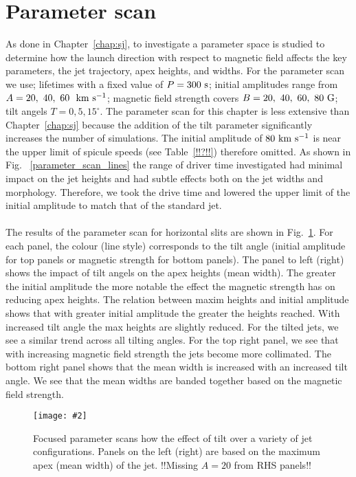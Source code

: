 \documentclass[12pt]{ociamthesis}
\newcommand{\mfig}[4]{
  \begin{figure}
  \begin{center}
  \texttt{[image: \#2]}
  \caption{#3}
  \label{#4}
  \end{center}
  \end{figure}}
\newcommand{\kms}{~\rm{km ~s^{-1}}}
\newcommand{\np}{\\ \\}
\begin{document}
\section{Parameter scan}
\label{sec:stab}
As done in Chapter~\ref{chap:sj}, to investigate a parameter space is studied to determine how the launch direction with respect to magnetic field affects the key parameters, the jet trajectory, apex heights, and widths. For the parameter scan we use; lifetimes with a fixed value of $P=300~\rm{s}$; initial amplitudes range from $A=20,~40,~60~\kms$; magnetic field strength covers $B=20,~40,~60,~80~\rm{G}$; tilt angels $T=0,5,15^{\circ}$. The parameter scan for this chapter is less extensive than Chapter~\ref{chap:sj} because the addition of the tilt parameter significantly increases the number of simulations. The initial amplitude of $80 \kms$ is near the upper limit of spicule speeds (see Table~\ref{!!?!!}) therefore omitted.  As shown in Fig. ~\ref{parameter_scan_lines} the range of driver time investigated had minimal impact on the jet heights and had subtle effects both on the jet widths and morphology.  Therefore, we took the drive time and lowered the upper limit of the initial amplitude to match that of the standard jet. \np
%
The results of the parameter scan for horizontal slits are shown in Fig.~\ref{p_scan_t_apex}. For each panel, the colour (line style) corresponds to the tilt angle (initial amplitude for top panels or magnetic strength for bottom panels). The panel to left (right) shows the impact of tilt angels on the apex heights (mean width). The greater the initial amplitude the more notable the effect the magnetic strength has on reducing apex heights. The relation between maxim heights and initial amplitude shows that with greater initial amplitude the greater the heights reached. With increased tilt angle the max heights are slightly reduced. For the tilted jets, we see a similar trend across all tilting angles. For the top right panel, we see that with increasing magnetic field strength the jets become more collimated. The bottom right panel shows that the mean width is increased with an increased tilt angle. We see that the mean widths are banded together based on the magnetic field strength.
\mfig{1}{figures/horizontal_slit_pscan.png}{Focused parameter scans how the effect of tilt over a variety of jet configurations. Panels on the left (right) are based on the maximum apex (mean width) of the jet.{\color{green} !!Missing $A=20$ from RHS panels!!}}{p_scan_t_apex}
\end{document}
